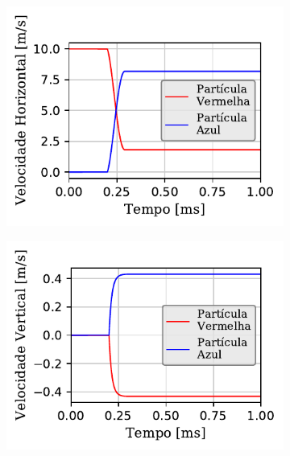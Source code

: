 \begin{figure}[H]
{\begin{subfigure}[t]{\smallresultsfigwidth}
			\caption{}
			\label{subfig:colliding_spheres:dissipative_rotation:y_position}
		\end{subfigure}
		\begin{subfigure}[t]{\smallresultsfigwidth}
			\centering
			\includegraphics[scale=1]{images/colliding_spheres/dissipative_rotation/Velocity-X_small.pdf}
			\caption{}
			\label{subfig:colliding_spheres:dissipative_rotation:x_velocity}
		\end{subfigure}
		\begin{subfigure}[t]{\smallresultsfigwidth}
			\centering
			\includegraphics[scale=1]{images/colliding_spheres/dissipative_rotation/Velocity-Y_small.pdf}
			\caption{}
			\label{subfig:colliding_spheres:dissipative_rotation:y_velocity}
		\end{subfigure}
}
\end{figure}
